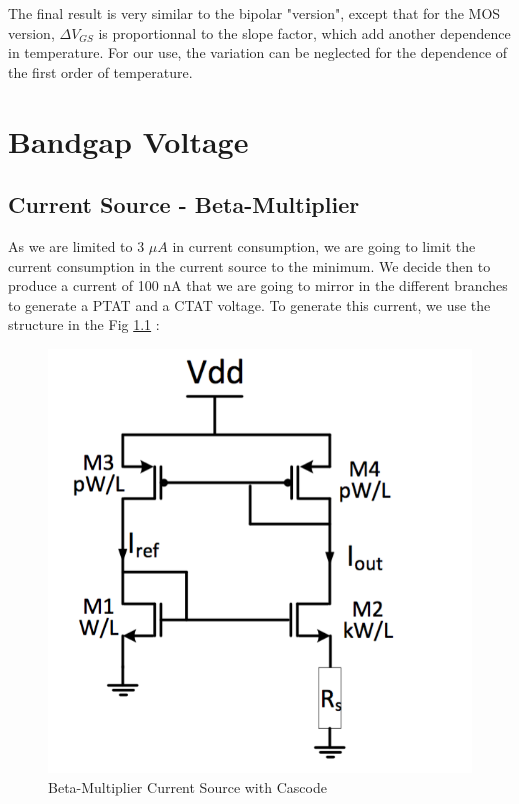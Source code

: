 \documentclass[11pt,a4paper]{report}
\begin{document}
The final result is very similar to the bipolar "version", except that for the MOS version, $\Delta V_{GS}$ is proportionnal to the slope factor, which add another dependence in temperature. For our use, the variation can be neglected for the dependence of the first order of temperature. 

\chapter{Bandgap Voltage}
\section{Current Source - Beta-Multiplier}

As we are limited to 3 $\mu A$ in current consumption, we are going to limit the current consumption in the current source to the minimum. We decide then to produce a current of 100 nA that we are going to mirror in the different branches to generate a PTAT and a CTAT voltage.
To generate this current, we use the structure in the Fig \ref{beta_m} :

\begin{figure}[h]
  \begin{center}
    \includegraphics[scale=0.25]{photo/beta_multiplier}
  \end{center}
  \caption{Beta-Multiplier Current Source with Cascode}
  \label{beta_m}
\end{figure}
\end{document}
